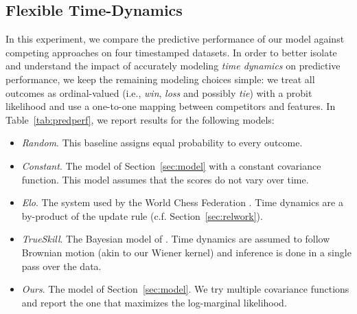 \subsection{Flexible Time-Dynamics}
\label{sec:evaldyn}

In this experiment, we compare the predictive performance of our model against competing approaches on four timestamped datasets.
In order to better isolate and understand the impact of accurately modeling \emph{time dynamics} on predictive performance, we keep the remaining modeling choices simple: we treat all outcomes as ordinal-valued (i.e., \emph{win}, \emph{loss} and possibly \emph{tie}) with a probit likelihood and use a one-to-one mapping between competitors and features.
In Table~\ref{tab:predperf}, we report results for the following models:
\begin{itemize}
	\item \emph{Random}. This baseline assigns equal probability to every outcome.

	\item \emph{Constant}. The model of Section~\ref{sec:model} with a constant covariance function.
	      This model assumes that the scores do not vary over time.

	\item \emph{Elo}. The system used by the World Chess Federation \citep{elo1978rating}.
	      Time dynamics are a by-product of the update rule (c.f. Section~\ref{sec:relwork}).

	\item \emph{TrueSkill}. The Bayesian model of \citet{herbrich2006trueskill}.
	      Time dynamics are assumed to follow Brownian motion (akin to our Wiener kernel) and inference is done in a single pass over the data.

	\item \emph{Ours}. The model of Section~\ref{sec:model}.
	      We try multiple covariance functions and report the one that maximizes the log-marginal likelihood.
\end{itemize}


